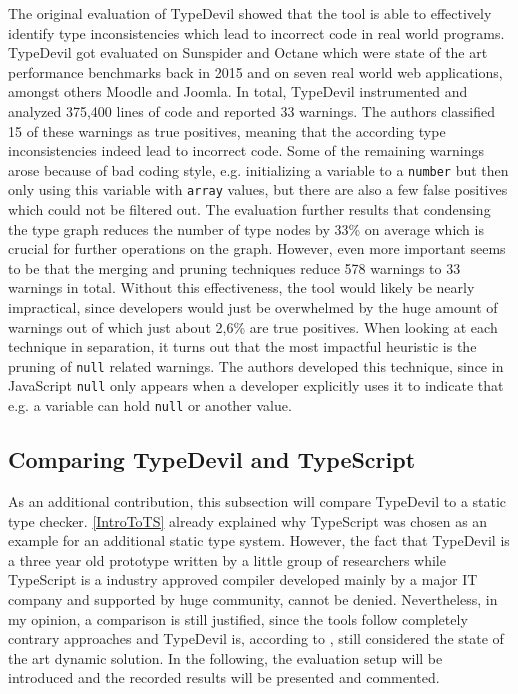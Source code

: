 \documentclass[runningheads,a4paper]{llncs}
\begin{document}
The original evaluation of TypeDevil showed that the tool is able to effectively identify type inconsistencies which lead to incorrect code in real world programs.
TypeDevil got evaluated on Sunspider and Octane which were state of the art performance benchmarks back in 2015 and on seven real world web applications, amongst others Moodle and Joomla.
In total, TypeDevil instrumented and analyzed 375,400 lines of code and reported 33 warnings.
The authors classified 15 of these warnings as true positives, meaning that the according type inconsistencies indeed lead to incorrect code.
Some of the remaining warnings arose because of bad coding style, e.g. initializing a variable to a \lstinline[columns=fixed]{number} but then only using this variable with \lstinline[columns=fixed]{array} values, but there are also a few false positives which could not be filtered out.
The evaluation further results that condensing the type graph reduces the number of type nodes by 33\% on average which is crucial for further operations on the graph.
However, even more important seems to be that the merging and pruning techniques reduce 578 warnings to 33 warnings in total.
Without this effectiveness, the tool would likely be nearly impractical, since developers would just be overwhelmed by the huge amount of warnings out of which just about 2,6\% are true positives. 
When looking at each technique in separation, it turns out that the most impactful heuristic is the pruning of \lstinline[columns=fixed]{null} related warnings. 
The authors developed this technique, since in JavaScript \lstinline[columns=fixed]{null} only appears when a developer explicitly uses it to indicate that e.g. a variable can hold \lstinline[columns=fixed]{null} or another value.

\subsection{Comparing TypeDevil and TypeScript} \label{comparison}
As an additional contribution, this subsection will compare TypeDevil to a static type checker.
\ref{IntroToTS} already explained why TypeScript was chosen as an example for an additional static type system.
However, the fact that TypeDevil is a three year old prototype written by a little group of researchers while TypeScript is a industry approved compiler developed mainly by a major IT company and supported by huge community, cannot be denied.
Nevertheless, in my opinion, a comparison is still justified, since the tools follow completely contrary approaches and TypeDevil is, according to \cite{DBLP:conf/icse/TanXCLYS17}, still considered the state of the art dynamic solution.
In the following, the evaluation setup will be introduced and the recorded results will be presented and commented. 
\end{document}
